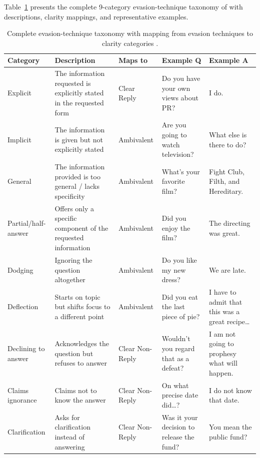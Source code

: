 \documentclass[11pt]{article}
\begin{document}
Table~\ref{tab:taxonomy} presents the complete 9-category evasion-technique taxonomy of \citet{thomas2024isaidthatdataset} with descriptions, clarity mappings, and representative examples.

\begin{table}[htbp]
\centering
\small
\begin{tabular}{@{}p{2.2cm}p{3.8cm}p{1.8cm}p{3.0cm}p{3.5cm}@{}}
\toprule
\textbf{Category} & \textbf{Description} & \textbf{Maps to} & \textbf{Example Q} & \textbf{Example A} \\
\midrule
Explicit & The information requested is explicitly stated in the requested form & Clear Reply & Do you have your own views about PR? & I do. \\
\addlinespace
Implicit & The information is given but not explicitly stated & Ambivalent & Are you going to watch television? & What else is there to do? \\
\addlinespace
General & The information provided is too general / lacks specificity & Ambivalent & What's your favorite film? & Fight Club, Filth, and Hereditary. \\
\addlinespace
Partial/half-answer & Offers only a specific component of the requested information & Ambivalent & Did you enjoy the film? & The directing was great. \\
\addlinespace
Dodging & Ignoring the question altogether & Ambivalent & Do you like my new dress? & We are late. \\
\addlinespace
Deflection & Starts on topic but shifts focus to a different point & Ambivalent & Did you eat the last piece of pie? & I have to admit that this was a great recipe\ldots \\
\addlinespace
Declining to answer & Acknowledges the question but refuses to answer & Clear Non-Reply & Wouldn't you regard that as a defeat? & I am not going to prophesy what will happen. \\
\addlinespace
Claims ignorance & Claims not to know the answer & Clear Non-Reply & On what precise date did\ldots? & I do not know that date. \\
\addlinespace
Clarification & Asks for clarification instead of answering & Clear Non-Reply & Was it your decision to release the fund? & You mean the public fund? \\
\bottomrule
\end{tabular}
\caption{Complete evasion-technique taxonomy with mapping from evasion techniques to clarity categories \citep{thomas2024isaidthatdataset}.}
\label{tab:taxonomy}
\end{table}
\end{document}
